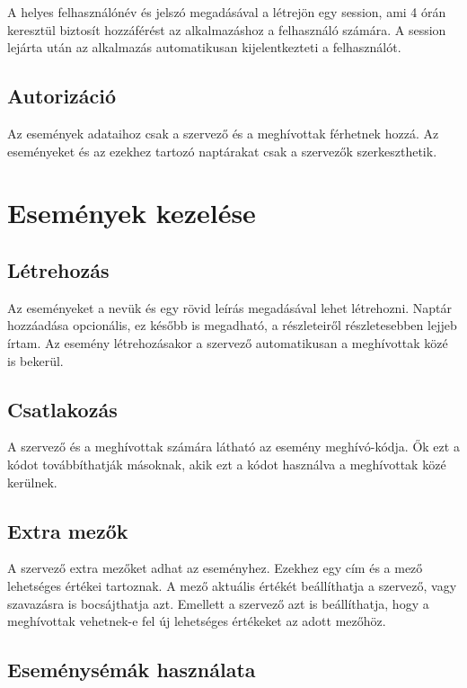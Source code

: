 \documentclass[a4paper,12pt]{report}
\theoremstyle{definition}
\theoremstyle{remark}
\begin{document}
A helyes felhasználónév és jelszó megadásával a létrejön egy session, ami 4 órán keresztül biztosít hozzáférést az alkalmazáshoz a felhasználó számára. A session lejárta után az alkalmazás automatikusan kijelentkezteti a felhasználót.

	\subsection{Autorizáció}

Az események adataihoz csak a szervező és a meghívottak férhetnek hozzá. Az eseményeket és az ezekhez tartozó naptárakat csak a szervezők szerkeszthetik.

\section{Események kezelése}

	\subsection{Létrehozás}

Az eseményeket a nevük és egy rövid leírás megadásával lehet létrehozni. Naptár hozzáadása opcionális, ez később is megadható, a részleteiről részletesebben lejjeb írtam.  Az esemény létrehozásakor a szervező automatikusan a meghívottak közé is bekerül.

	\subsection{Csatlakozás}

A szervező és a meghívottak számára látható az esemény meghívó-kódja. Ők ezt a kódot továbbíthatják másoknak, akik ezt a kódot használva a meghívottak közé kerülnek.

	\subsection{Extra mezők}

A szervező extra mezőket adhat az eseményhez. Ezekhez egy cím és a mező lehetséges értékei tartoznak. A mező aktuális értékét beállíthatja a szervező, vagy szavazásra is bocsájthatja azt. Emellett a szervező azt is beállíthatja, hogy a meghívottak vehetnek-e fel új lehetséges értékeket az adott mezőhöz.

	\subsection{Eseménysémák használata}
\end{document}

